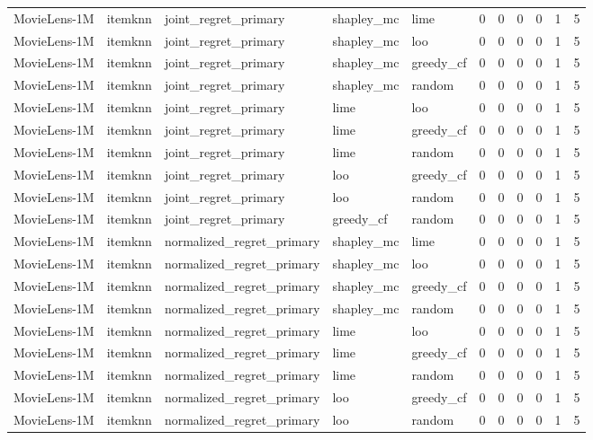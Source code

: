 \begin{table}[t]
{\begin{tabular}{lllllrrrrrr}
MovieLens-1M & itemknn & joint\_regret\_primary & shapley\_mc & lime & 0 & 0 & 0 & 0 & 1 & 5 \\
MovieLens-1M & itemknn & joint\_regret\_primary & shapley\_mc & loo & 0 & 0 & 0 & 0 & 1 & 5 \\
MovieLens-1M & itemknn & joint\_regret\_primary & shapley\_mc & greedy\_cf & 0 & 0 & 0 & 0 & 1 & 5 \\
MovieLens-1M & itemknn & joint\_regret\_primary & shapley\_mc & random & 0 & 0 & 0 & 0 & 1 & 5 \\
MovieLens-1M & itemknn & joint\_regret\_primary & lime & loo & 0 & 0 & 0 & 0 & 1 & 5 \\
MovieLens-1M & itemknn & joint\_regret\_primary & lime & greedy\_cf & 0 & 0 & 0 & 0 & 1 & 5 \\
MovieLens-1M & itemknn & joint\_regret\_primary & lime & random & 0 & 0 & 0 & 0 & 1 & 5 \\
MovieLens-1M & itemknn & joint\_regret\_primary & loo & greedy\_cf & 0 & 0 & 0 & 0 & 1 & 5 \\
MovieLens-1M & itemknn & joint\_regret\_primary & loo & random & 0 & 0 & 0 & 0 & 1 & 5 \\
MovieLens-1M & itemknn & joint\_regret\_primary & greedy\_cf & random & 0 & 0 & 0 & 0 & 1 & 5 \\
MovieLens-1M & itemknn & normalized\_regret\_primary & shapley\_mc & lime & 0 & 0 & 0 & 0 & 1 & 5 \\
MovieLens-1M & itemknn & normalized\_regret\_primary & shapley\_mc & loo & 0 & 0 & 0 & 0 & 1 & 5 \\
MovieLens-1M & itemknn & normalized\_regret\_primary & shapley\_mc & greedy\_cf & 0 & 0 & 0 & 0 & 1 & 5 \\
MovieLens-1M & itemknn & normalized\_regret\_primary & shapley\_mc & random & 0 & 0 & 0 & 0 & 1 & 5 \\
MovieLens-1M & itemknn & normalized\_regret\_primary & lime & loo & 0 & 0 & 0 & 0 & 1 & 5 \\
MovieLens-1M & itemknn & normalized\_regret\_primary & lime & greedy\_cf & 0 & 0 & 0 & 0 & 1 & 5 \\
MovieLens-1M & itemknn & normalized\_regret\_primary & lime & random & 0 & 0 & 0 & 0 & 1 & 5 \\
MovieLens-1M & itemknn & normalized\_regret\_primary & loo & greedy\_cf & 0 & 0 & 0 & 0 & 1 & 5 \\
MovieLens-1M & itemknn & normalized\_regret\_primary & loo & random & 0 & 0 & 0 & 0 & 1 & 5 \\

\end{tabular}}
\end{table}
